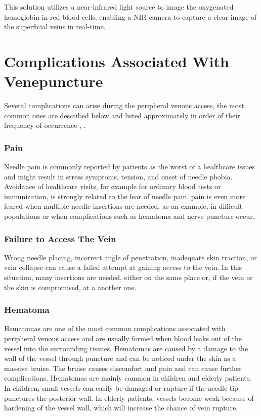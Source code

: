 This solution utilizes a near-infrared light source to image the oxygenated hemoglobin in red blood cells, enabling a NIR-camera to capture a clear image of the superficial veins in real-time. 

\section{Complications Associated With Venepuncture}

Several complications can arise during the peripheral venous access, the most common ones are described below and listed approximately in order of their frequency of occurrence \parencite{comlicationsVeni}, \parencite{roboVenipuncture}.

\subsubsection{Pain}
Needle pain is commonly reported by patients as the worst of a healthcare issues and might result in stress symptoms, tension, and onset of needle phobia. Avoidance of healthcare visits, for example for ordinary blood tests or immunization, is strongly related to the fear of needle pain. pain is even more feared when multiple needle insertions are needed, as an example, in difficult populations or when complications such as hematoma and nerve puncture occur.

\subsubsection{Failure to Access The Vein}
Wrong needle placing, incorrect angle of penetration, inadequate skin traction, or vein collapse can cause a failed attempt at gaining access to the vein. In this situation, many insertions are needed, either on the same place or, if the vein or the skin is compromised, at a another one.

\subsubsection{Hematoma}
Hematomas are one of the most common complications associated with peripheral venous access and are usually formed when blood leaks out of the vessel into the surrounding tissues. Hematomas are caused by a damage to the wall of the vessel through puncture and can be noticed under the skin as a massive bruise. The bruise causes discomfort and pain and can cause further complications. Hematomas are mainly common in children and elderly patients. In children, small vessels can easily be damaged or rupture if the needle tip punctures the posterior wall.
In elderly patients, vessels become weak because of hardening of the vessel wall, which will increase the chance of vein rupture. 

